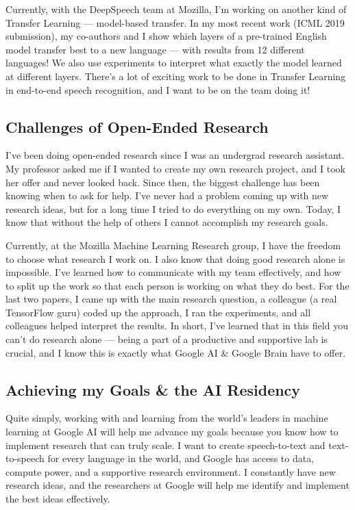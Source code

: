 \documentclass[12pt,a4paper]{article}
\begin{document}
Currently, with the DeepSpeech team at Mozilla, I'm working on another kind of Transfer Learning --- model-based transfer. In my most recent work (ICML 2019 submission), my co-authors and I show which layers of a pre-trained English model transfer best to a new language --- with results from 12 different languages! We also use experiments to interpret what exactly the model learned at different layers. There's a lot of exciting work to be done in Transfer Learning in end-to-end speech recognition, and I want to be on the team doing it!


\subsection*{Challenges of Open-Ended Research}

I've been doing open-ended research since I was an undergrad research assistant. My professor asked me if I wanted to create my own research project, and I took her offer and never looked back. Since then, the biggest challenge has been knowing when to ask for help. I've never had a problem coming up with new research ideas, but for a long time I tried to do everything on my own. Today, I know that without the help of others I cannot accomplish my research goals.

Currently, at the Mozilla Machine Learning Research group, I have the freedom to choose what research I work on. I also know that doing good research alone is impossible. I've learned how to communicate with my team effectively, and how to split up the work so that each person is working on what they do best. For the last two papers, I came up with the main research question, a colleague (a real TensorFlow guru) coded up the approach, I ran the experiments, and all colleagues helped interpret the results. In short, I've learned that in this field you can't do research alone --- being a part of a productive and supportive lab is crucial, and I know this is exactly what Google AI \& Google Brain have to offer.

\subsection*{Achieving my Goals \& the AI Residency}

Quite simply, working with and learning from the world's leaders in machine learning at Google AI will help me advance my goals because you know how to implement research that can truly scale. I want to create speech-to-text and text-to-speech for every language in the world, and Google has access to data, compute power, and a supportive research environment. I constantly have new research ideas, and the researchers at Google will help me identify and implement the best ideas effectively.
\end{document}
